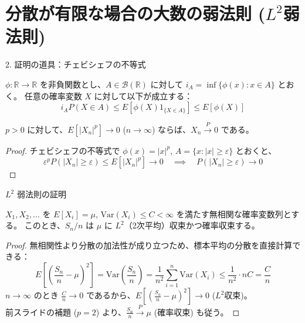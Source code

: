 \documentclass[10pt, aspectratio=169, dvipdfmx]{beamer}
\begin{document}
\section{分散が有限な場合の大数の弱法則 ($L^2$弱法則)}

\begin{frame}{2. 証明の道具：チェビシェフの不等式}
    \begin{theorem}
        $\phi: \mathbb{R} \to \mathbb{R}$ を非負関数とし、$A \in \mathcal{B}(\mathbb{R})$ に対して $i_A = \inf \{\phi(x) : x \in A\}$ とおく。
        任意の確率変数 $X$ に対して以下が成立する：
        \[
            i_A P(X \in A) \le E[\phi(X) 1_{\{X \in A\}}] \le E[\phi(X)]
        \]
    \end{theorem}

    \pause
    \begin{lemma}[$p$次平均収束と確率収束]
        $p>0$ に対して、$E[|X_n|^p] \to 0$ ($n \to \infty$) ならば、$X_n \xrightarrow{P} 0$ である。
    \end{lemma}

    \begin{proof}
        チェビシェフの不等式で $\phi(x) = |x|^p$, $A = \{x : |x| \ge \varepsilon\}$ とおくと、
        \[
            \varepsilon^p P(|X_n| \ge \varepsilon) \le E[|X_n|^p] \to 0 \quad \implies \quad P(|X_n| \ge \varepsilon) \to 0
        \]
    \end{proof}
\end{frame}

\begin{frame}{$L^2$ 弱法則の証明}
    \begin{theorem}[$L^2$ 弱法則]
        $X_1, X_2, \dots$ を $E[X_i] = \mu$, $\text{Var}(X_i) \le C < \infty$ を満たす無相関な確率変数列とする。
        このとき、$S_n/n$ は $\mu$ に $L^2$（2次平均）収束かつ確率収束する。
    \end{theorem}

    \pause
    \begin{proof}
        無相関性より分散の加法性が成り立つため、標本平均の分散を直接計算できる：
        \[
            E\left[\left(\frac{S_n}{n} - \mu\right)^2\right] = \text{Var}\left(\frac{S_n}{n}\right) = \frac{1}{n^2}\sum_{i=1}^n \text{Var}(X_i) \le \frac{1}{n^2} \cdot nC = \frac{C}{n}
        \]
        \pause
        $n \to \infty$ のとき $\frac{C}{n} \to 0$ であるから、$E\left[\left(\frac{S_n}{n} - \mu\right)^2\right] \to 0$ ($L^2$収束)。\\
        前スライドの補題 ($p=2$) より、$\frac{S_n}{n} \xrightarrow{P} \mu$ (確率収束) も従う。
    \end{proof}
\end{frame}
\end{document}
